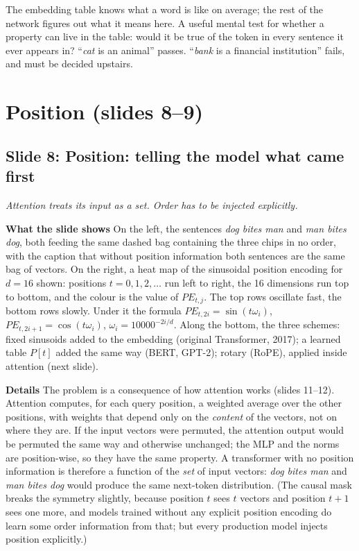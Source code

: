 \documentclass[11pt,letterpaper]{article}
\newcommand{\setstage}[1]{\colorlet{stagec}{#1}}
\newcommand{\slide}[3]{%
  \subsection[Slide #1: #2]{Slide #1: #2}%
  {\color{muted}\itshape #3\par}\medskip}
\newcommand{\para}[1]{\medskip\noindent\textbf{#1}\quad}
\newenvironment{intuition}{\begin{tcolorbox}[intuitionbox]}{\end{tcolorbox}}
\begin{document}
\begin{intuition}
The embedding table knows what a word is like on average; the rest of the network figures out what it means here. A useful mental test for whether a property can live in the table: would it be true of the token in every sentence it ever appears in? ``\emph{cat} is an animal'' passes. ``\emph{bank} is a financial institution'' fails, and must be decided upstairs.
\end{intuition}

\setstage{posc}
\section{Position (slides 8--9)}

\slide{8}{Position: telling the model what came first}{Attention treats its input as a set. Order has to be injected explicitly.}

\para{What the slide shows} On the left, the sentences \emph{dog bites man} and \emph{man bites dog}, both feeding the same dashed bag containing the three chips in no order, with the caption that without position information both sentences are the same bag of vectors. On the right, a heat map of the sinusoidal position encoding for $d=16$ shown: positions $t=0,1,2,\dots$ run left to right, the 16 dimensions run top to bottom, and the colour is the value of $PE_{t,j}$. The top rows oscillate fast, the bottom rows slowly. Under it the formula $PE_{t,2i}=\sin(t\omega_i)$, $PE_{t,2i+1}=\cos(t\omega_i)$, $\omega_i=10000^{-2i/d}$. Along the bottom, the three schemes: fixed sinusoids added to the embedding (original Transformer, 2017); a learned table $P[t]$ added the same way (BERT, GPT-2); rotary (RoPE), applied inside attention (next slide).

\para{Details} The problem is a consequence of how attention works (slides 11--12). Attention computes, for each query position, a weighted average over the other positions, with weights that depend only on the \emph{content} of the vectors, not on where they are. If the input vectors were permuted, the attention output would be permuted the same way and otherwise unchanged; the MLP and the norms are position-wise, so they have the same property. A transformer with no position information is therefore a function of the \emph{set} of input vectors: \emph{dog bites man} and \emph{man bites dog} would produce the same next-token distribution. (The causal mask breaks the symmetry slightly, because position $t$ sees $t$ vectors and position $t+1$ sees one more, and models trained without any explicit position encoding do learn some order information from that; but every production model injects position explicitly.)
\end{document}

